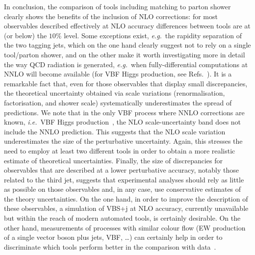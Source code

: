 \documentclass[twocolumn,epjc3]{svjour3} %
\begin{document}
In conclusion, the comparison of tools including matching to parton shower clearly shows the benefits of the inclusion of NLO corrections: for most observables described
effectively at NLO accuracy differences between tools are at (or below) the $10\%$ level.
Some exceptions exist, \emph{e.g.}\ the rapidity separation of the two tagging jets, which on the one hand
clearly suggest not to rely on a single tool/parton shower, and on the other make it worth investigating more in detail the way QCD radiation is
generated, \emph{e.g.}\ when fully-differential computations at NNLO will become available (for VBF Higgs production, see Refs.~\cite{Cacciari:2015jma, Cruz-Martinez:2018rod}). It is a remarkable fact that, even for those observables that display small discrepancies,
the theoretical uncertainty obtained via scale variations (renormalisation, factorisation, and show\-er scale) 
systematically underestimates the spread of predictions. We note 
that in the only VBF process where NNLO corrections are known, \emph{i.e.}\ VBF Higgs production~\cite{Cacciari:2015jma, Cruz-Martinez:2018rod}, 
the NLO scale-uncertainty band does not include the NNLO prediction. This suggests that the NLO scale variation 
underestimates the size of the perturbative uncertainty. Again, this stresses the need
 to employ at least two different tools in order to obtain a more realistic estimate of theoretical uncertainties. Finally, the size of discrepancies for observables that are described at a lower perturbative accuracy, notably those related to the third jet, suggests that
experimental analyses should rely as little as possible on those observables and, in any case, use conservative estimates of the theory
uncertainties. On the one hand, in order to improve the
description of these observables, a simulation of VBS+j at NLO accuracy, currently unavailable but within the reach of modern
automated tools, is certainly desirable.
On the other hand, measurements of processes with similar
colour flow (EW production of a single vector boson plus jets,
VBF, \ldots) can certainly help in order to discriminate which tools perform better in the comparison with data~\cite{Aaboud:2017emo,Sirunyan:2017jej}.
\end{document}
